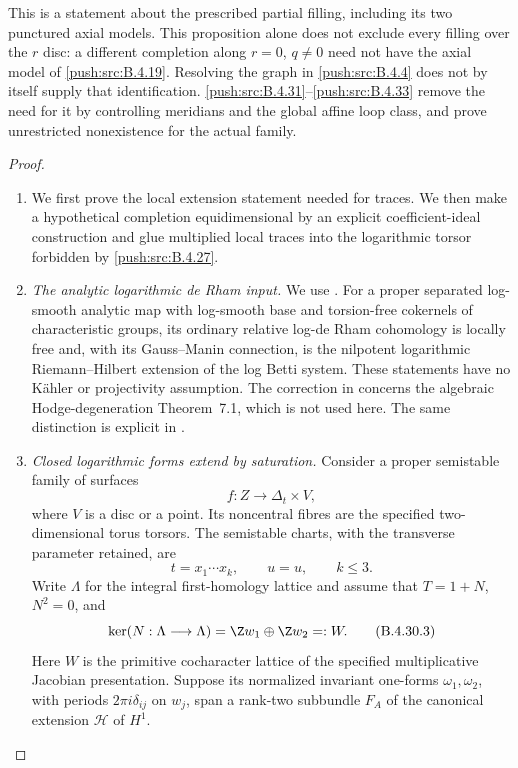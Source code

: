 \begin{proposition}
This is a statement about the prescribed partial
filling, including its two punctured axial models.
This proposition alone does not exclude every filling
over the $r$ disc: a different completion along
$r=0$, $q\ne0$ need not have the axial model of
\ref{push:src:B.4.19}. Resolving the graph in \ref{push:src:B.4.4} does not by
itself supply that identification. \ref{push:src:B.4.31}--\ref{push:src:B.4.33}
remove the need for it by controlling meridians and
the global affine loop class, and prove unrestricted
nonexistence for the actual family.
\end{proposition}



\begin{proof}
\begin{enumerate}[label=\arabic*.,leftmargin=*]
\item We first prove the local extension statement
needed for traces. We then make a hypothetical
completion equidimensional by an explicit
coefficient-ideal construction and glue multiplied
local traces into the logarithmic torsor
forbidden by \ref{push:src:B.4.27}.

\item \emph{The analytic logarithmic de Rham input.}
We use \citet[Theorems 6.2 and 6.3,
pp.~32 and 34]{IKN2005E}. For a proper separated
log-smooth analytic map with log-smooth base and
torsion-free cokernels of characteristic groups,
its ordinary relative log-de Rham cohomology is
locally free and, with its Gauss--Manin
connection, is the nilpotent logarithmic
Riemann--Hilbert extension of the log Betti
system. These statements have no K\"ahler or
projectivity assumption. The correction in
\citet{IKN2007ErratumE} concerns the algebraic
Hodge-degeneration Theorem~7.1, which is not
used here. The same distinction is explicit in
\citet[Definition 7.1(i) and Section 9.2,
pp.~164--165 and 173]{KKN2008PicardE}.

\item \emph{Closed logarithmic forms extend by saturation.}
Consider a proper semistable family of surfaces
\[
 f:Z\longrightarrow\Delta_t\times V,
 \tag{B.4.30.1}
\]
where $V$ is a disc or a point. Its noncentral
fibres are the specified two-dimensional torus
torsors. The semistable charts, with the
transverse parameter retained, are
\[
 t=x_1\cdots x_k,\qquad u=u,\qquad k\le3.
 \tag{B.4.30.2}
\]
Write $\Lambda$ for the integral first-homology
lattice and assume that $T=1+N$, $N^2=0$, and
\[
 \ker(N:\Lambda\longrightarrow\Lambda)
       =\Z w_1\oplus\Z w_2=:W.
 \tag{B.4.30.3}
\]
Here $W$ is the primitive cocharacter lattice
of the specified multiplicative Jacobian
presentation. Suppose its normalized invariant
one-forms $\omega_1,\omega_2$, with periods
$2\pi i\delta_{ij}$ on $w_j$, span a rank-two
subbundle $F_A$ of the canonical extension
$\mathcal H$ of $H^1$.


\end{enumerate}
\end{proof}
